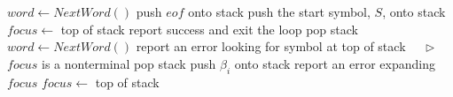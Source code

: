 \documentclass[varwidth=\maxdimen]{standalone}
\newcommand{\LeftComment}[1]{$\quad\triangleright$ #1}
\begin{document}
\begin{algorithmic}[1] %
  \State $word \gets NextWord()$
  \State push $eof$ onto stack
  \State push the start symbol, $S$, onto stack
  \State $focus \gets $ top of stack
  \LoopForever
      \State report success and exit the loop
        \State pop stack
        \State $word \gets NextWord()$
      \Else
        \State report an error looking for symbol at top of stack
      \EndIf
    \Else  \LeftComment{$focus$ is a nonterminal}
        \State pop stack
            \State push $\beta_i$ onto stack
          \EndIf
        \EndFor
      \Else
        \State report an error expanding $focus$
      \EndIf
    \EndIf
    \State $focus \gets $ top of stack
  \EndLoopForever
\end{algorithmic}
\end{document}
